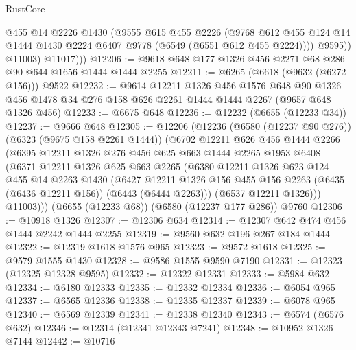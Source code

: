 \begin{lexlean}{RustCore}
\begin{coremodule}
{\begin{coremodule}
{{{{{{{{{{{{{{{{{{{{{{{{{{{{{{{{{{{{{{{{{{{{{                @455
                @14
                @2226
                @1430
                (@9555
                  @615
                  @455
                  @2226
                  (@9768
                    @612
                    @455
                    @124
                    @14
                    @1444
                    @1430
                    @2224
                    @6407
                    @9778
                    (@6549 (@6551 @612 @455 @2224))))
                @9595))
            @11003)
          @11017)))
@12206 := @9618 @648 @177 @1326 @456 @2271 @68 @286 @90 @644 @1656 @1444 @1444 @2255
@12211 := @6265 (@6618 (@9632 (@6272 @156))) @9522
@12232 := @9614
    @12211
    @1326
    @456
    @1576
    @648
    @90
    @1326
    @456
    @1478
    @34
    @276
    @158
    @626
    @2261
    @1444
    @1444
    @2267
    (@9657 @648 @1326 @456)
@12233 := @6675 @648
@12236 := @12232 (@6655 (@12233 @34))
@12237 := @9666 @648
@12305 := @12206
    (@12236
      (@6580 (@12237 @90 @276))
      (@6323 (@9675 @158 @2261 @1444))
      (@6702
        @12211
        @626
        @456
        @1444
        @2266
        (@6395
          @12211
          @1326
          @276
          @456
          @625
          @663
          @1444
          @2265
          @1953
          @6408
          (@6371
            @12211
            @1326
            @625
            @663
            @2265
            (@6380
              @12211
              @1326
              @623
              @124
              @455
              @14
              @2263
              @1430
              (@6427
                @12211
                @1326
                @156
                @455
                @156
                @2263
                (@6435 (@6436 @12211 @156))
                (@6443 (@6444 @2263)))
              (@6537 @12211 @1326)))
          @11003)))
    (@6655 (@12233 @68))
    (@6580 (@12237 @177 @286))
    @9760
@12306 := @10918 @1326
@12307 := @12306 @634
@12314 := @12307 @642 @474 @456 @1444 @2242 @1444 @2255
@12319 := @9560 @632 @196 @267 @184 @1444
@12322 := @12319 @1618 @1576 @965
@12323 := @9572 @1618
@12325 := @9579 @1555 @1430
@12328 := @9586 @1555 @9590 @7190
@12331 := @12323 (@12325 @12328 @9595)
@12332 := @12322 @12331
@12333 := @5984 @632
@12334 := @6180 @12333
@12335 := @12332 @12334
@12336 := @6054 @965
@12337 := @6565 @12336
@12338 := @12335 @12337
@12339 := @6078 @965
@12340 := @6569 @12339
@12341 := @12338 @12340
@12343 := @6574 (@6576 @632)
@12346 := @12314 (@12341 @12343 @7241)
@12348 := @10952 @1326 @7144
@12442 := @10716
}}}}}}}}}}}}}}}}}}}}}}}}}}}}}}}}}}}}}}}}}}}}}
\end{coremodule}}
\end{coremodule}
\end{lexlean}
